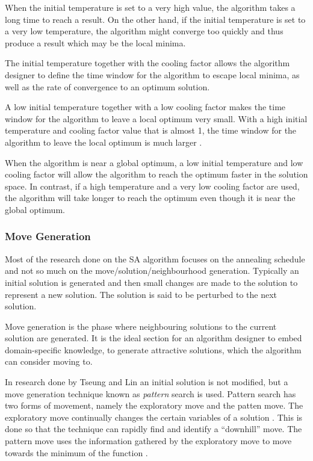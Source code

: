 When the initial temperature is set to a very high value, the algorithm takes a long time to reach a result. On the other hand, if the initial temperature is set to a very low temperature, the algorithm might converge too quickly and thus produce a result which may be the local minima\cite{SALongestCommon,VariousCoolingSA,AutoConfigSA}.

The initial temperature together with the cooling factor allows the algorithm designer to define the time window for the algorithm to escape local minima, as well as the rate of convergence to an optimum solution\cite{SALongestCommon,VariousCoolingSA}.

A low initial temperature together with a low cooling factor makes the time window for the algorithm to leave a local optimum very small\cite{SALongestCommon}. With a high initial temperature and cooling factor value that is almost 1, the time window for the algorithm to leave the local optimum is much larger \cite{SALongestCommon}. 

When the algorithm is near a global optimum, a low initial temperature and low cooling factor will allow the algorithm to reach the optimum faster in the solution space. In contrast, if a high temperature and a very low cooling factor are used, the algorithm will take longer to reach the optimum even though it is near the global optimum\cite{SALongestCommon}.

\subsubsection{Move Generation}
Most of the research done on the SA algorithm focuses on the annealing schedule and not so much on the move/solution/neighbourhood generation. Typically an initial solution is generated and then small changes are made to the solution to represent a new solution. The solution is said to be perturbed to the next solution.

Move generation is the phase where neighbouring solutions to the current solution are generated. It is the ideal section for an algorithm designer to embed domain-specific knowledge, to generate attractive solutions, which the algorithm can consider moving to.

In research done by Tseung and Lin \cite{CurveFittingSA} an initial solution is not modified, but a move generation technique known as \emph{pattern} search is used. Pattern search has two forms of movement, namely the exploratory move and the patten move. The exploratory move continually changes the certain variables of a solution \cite{CurveFittingSA}. This is done so that the technique can rapidly find and identify a ``downhill'' move. The pattern move uses the information gathered by the exploratory move to move towards the minimum of the function \cite{CurveFittingSA}.
